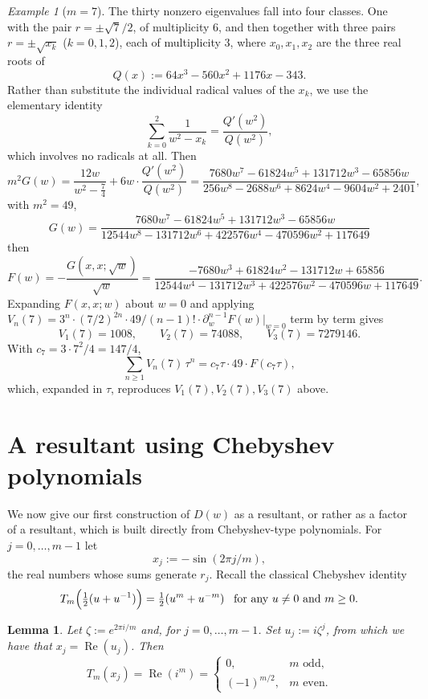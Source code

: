 \documentclass[11pt,reqno]{amsart}
\newtheorem{lemma}[theorem]{Lemma}
\theoremstyle{remark}
\newtheorem{example}[theorem]{Example}
\begin{document}
\begin{example}[$m=7$]
\label{ex:m7}
The thirty nonzero eigenvalues fall into four classes.  One with the pair $r=\pm\sqrt7/2$, of
multiplicity $6$, and then together with three pairs $r=\pm\sqrt{x_k}$ ($k=0,1,2$), each of multiplicity
$3$, where $x_0,x_1,x_2$ are the three real roots of
\[
Q(x) := 64x^3 - 560x^2 + 1176x - 343.
\]
Rather than substitute the individual radical values of the $x_k$, we use
the elementary identity
\[
\sum_{k=0}^{2}\frac{1}{w^2-x_k} = \frac{Q'(w^2)}{Q(w^2)},
\]
which involves no radicals at all. Then
\[
m^2 G(w) = \frac{12w}{w^2-\tfrac74} + 6w\cdot\frac{Q'(w^2)}{Q(w^2)}
= \frac{7680w^7-61824w^5+131712w^3-65856w}{256w^8-2688w^6+8624w^4-9604w^2+2401},
\]
with $m^2=49$,
\[
G(w) = \frac{7680w^7-61824w^5+131712w^3-65856w}{12544w^8-131712w^6+422576w^4-470596w^2+117649}
\]
then
\[
F(w) = -\frac{G(x,x;\sqrt w)}{\sqrt w}
= \frac{-7680w^3+61824w^2-131712w+65856}{12544w^4-131712w^3+422576w^2-470596w+117649}.
\]
Expanding $F(x,x;w)$ about $w=0$ and applying
$V_n(7) = 3^n\cdot(7/2)^{2n}\cdot 49/(n-1)!\cdot \partial_w^{n-1}F(w)\big|_{w=0}$ term by term
gives
\[
V_1(7) = 1008, \qquad V_2(7) = 74088, \qquad V_3(7) = 7279146.
\]
With $c_7 = 3\cdot 7^2/4 = 147/4$,
\[
\sum_{n\ge1} V_n(7)\,\tau^n = c_7\tau\cdot 49\cdot F(c_7\tau),
\]
which, expanded in $\tau$, reproduces $V_1(7), V_2(7), V_3(7)$ above.
\end{example}


\section{A resultant using Chebyshev polynomials}
\label{sec:first-construction}

We now give our first construction of $D(w)$ as a resultant, or rather as a factor
of a resultant, which is built directly from
Chebyshev-type polynomials. For $j = 0,\dots,m-1$ let
\[
x_j := -\sin(2\pi j/m),
\]
the real numbers whose sums generate $r_j$. Recall the classical Chebyshev identity
\[
T_m\Bigl(\tfrac12(u+u^{-1})\Bigr) = \tfrac12(u^m+u^{-m})
\,\,\,\,\,
\textrm{\rm for any  $u \neq 0$ and $m \geq 0$.}
\]

\begin{lemma}\label{lem:first_resultant_lemma}
Let $\zeta := e^{2\pi i/m}$ and, for $j=0,\dots,m-1$.  Set $u_j := i\zeta^j$, from which
we have that $x_j = \operatorname{Re}(u_j)$.  Then
\[
T_m(x_j) = \operatorname{Re}(i^m) =
\begin{cases}
0, & m \text{ odd},\\[2pt]
(-1)^{m/2}, & m \text{ even}.
\end{cases}
\]
\end{lemma}
\end{document}

